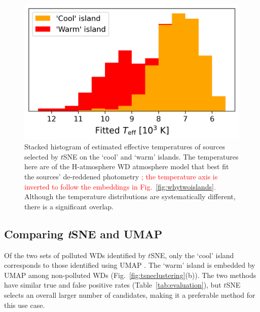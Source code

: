 \documentclass[fleqn,usenatbib]{rasti}
\newcommand{\red}[1]{\textcolor{red}{#1}}
\begin{document}
\begin{figure}
\centering
\includegraphics[width=\columnwidth]{figures/fig9_clustercomparison.png}
\caption{
    Stacked histogram of estimated effective temperatures of sources selected by $t$SNE on the `cool' and `warm' islands.
    The temperatures here are of the H-atmosphere WD atmosphere model that best fit the sources' de-reddened photometry \citep{gentilefusillo21}\red{; the temperature axis is inverted to follow the embeddings in Fig.~\ref{fig:whytwoislands}.}
    Although the temperature distributions are systematically different, there is a significant overlap.
}
\label{fig:tempdistr}
\end{figure}



\subsection{Comparing \textit{t}SNE and UMAP}
\label{sec:tsnevumap}

Of the two sets of polluted WDs identified by $t$SNE, only the `cool' island corresponds to those identified using UMAP \citep[see also Fig.~\ref{fig:tsneclustering}]{kao24}.
The `warm' island is embedded by UMAP among non-polluted WDs (Fig.~\ref{fig:tsneclustering}(b)).
The two methods have similar true and false positive rates (Table~\ref{tab:evaluation}), but $t$SNE selects an overall larger number of candidates, making it a preferable method for this use case.
\end{document}
